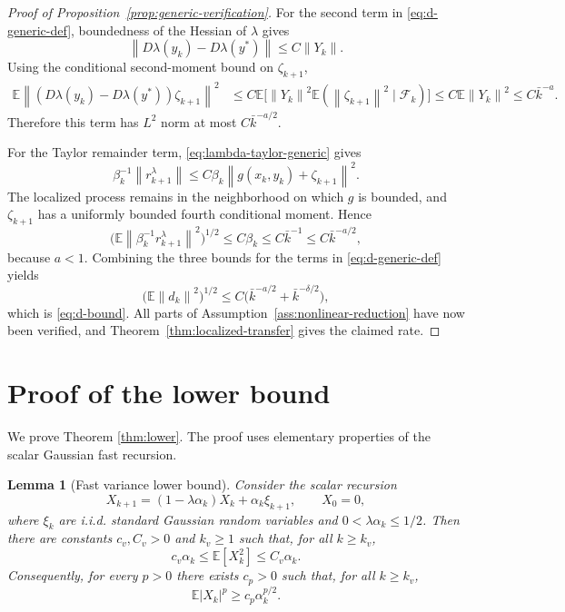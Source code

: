 \documentclass{article}
\newtheorem{lemma}[theorem]{Lemma}
\newcommand{\E}{\mathbb{E}}
\newcommand{\norm}[1]{\left\lVert #1\right\rVert}
\begin{document}
\begin{proof}[Proof of Proposition~\ref{prop:generic-verification}]
For the second term in \eqref{eq:d-generic-def}, boundedness of the Hessian of $\lambda$ gives
\[
  \norm{D\lambda(y_k)-D\lambda(y^*)}\le C\norm{Y_k}.
\]
Using the conditional second-moment bound on $\zeta_{k+1}$,
\begin{align*}
  \E\norm{(D\lambda(y_k)-D\lambda(y^*))\zeta_{k+1}}^2
  &\le C\E\big[\norm{Y_k}^2\E(\norm{\zeta_{k+1}}^2\mid\mathcal F_k)\big]
   \le C\E\norm{Y_k}^2
   \le C\bar k^{-a}.
\end{align*}
Therefore this term has $L^2$ norm at most $C\bar k^{-a/2}$.

For the Taylor remainder term, \eqref{eq:lambda-taylor-generic} gives
\[
  \beta_k^{-1}\norm{r^\lambda_{k+1}}
  \le C\beta_k\norm{g(x_k,y_k)+\zeta_{k+1}}^2.
\]
The localized process remains in the neighborhood on which $g$ is bounded, and $\zeta_{k+1}$ has a uniformly bounded fourth conditional moment. Hence
\[
  \big(\E\norm{\beta_k^{-1}r^\lambda_{k+1}}^2\big)^{1/2}
  \le C\beta_k
  \le C\bar k^{-1}
  \le C\bar k^{-a/2},
\]
because $a<1$. Combining the three bounds for the terms in \eqref{eq:d-generic-def} yields
\[
  \big(\E\norm{d_k}^2\big)^{1/2}
  \le C\big(\bar k^{-a/2}+\bar k^{-\delta/2}\big),
\]
which is \eqref{eq:d-bound}. All parts of Assumption~\ref{ass:nonlinear-reduction} have now been verified, and Theorem~\ref{thm:localized-transfer} gives the claimed rate.
\end{proof}

\section{Proof of the lower bound}\label{app:lower}

We prove Theorem \ref{thm:lower}. The proof uses elementary properties of the scalar Gaussian fast recursion.

\begin{lemma}[Fast variance lower bound]\label{lem:variance-lower}
Consider the scalar recursion
\[
  X_{k+1}=(1-\lambda\alpha_k)X_k+\alpha_k\xi_{k+1},
  \qquad X_0=0,
\]
where $\xi_k$ are i.i.d. standard Gaussian random variables and $0<\lambda\alpha_k\le1/2$. Then there are constants $c_v,C_v>0$ and $k_v\ge1$ such that, for all $k\ge k_v$,
\begin{equation}
  c_v\alpha_k\le \E[X_k^2]\le C_v\alpha_k. \label{eq:variance-two-sided}
\end{equation}
Consequently, for every $p>0$ there exists $c_p>0$ such that, for all $k\ge k_v$,
\begin{equation}
  \E|X_k|^p\ge c_p\alpha_k^{p/2}. \label{eq:gaussian-p-lower}
\end{equation}
\end{lemma}
\end{document}
